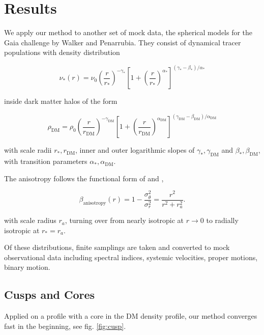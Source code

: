 \section{Results}\label{sec:results}

We apply our method to another set of mock data, the spherical models
for the Gaia challenge by Walker and Penarrubia. They consist of
dynamical tracer populations with density distribution

\begin{equation}
\nu_*(r) = \nu_0\left(\frac{r}{r_*}\right)^{-\gamma_*} \left[1+\left(\frac{r}{r_*}\right)^{\alpha_*}\right]^{(\gamma_*-\beta_*)/\alpha_*}
\end{equation}

inside dark matter halos of the form

\begin{equation}
\rho_{\text{DM}} = \rho_0\left(\frac{r}{r_{\text{DM}}}\right)^{-\gamma_{\text{DM}}}\left[1+\left(\frac{r}{r_{\text{DM}}}\right)^{\alpha_{\text{DM}}}\right]^{(\gamma_{\text{DM}}-\beta_{\text{DM}})/\alpha_{\text{DM}}}
\end{equation}

with scale radii $r_*, r_\text{DM}$, inner and outer logarithmic
slopes of $\gamma_*, \gamma_{\text{DM}}$ and
$\beta_*,\beta_{\text{DM}}$, with transition parameters $\alpha_*,
\alpha_{\text{DM}}$.

The anisotropy follows the functional form of \citet{Osipkov1979} and
\citet{Merritt1985},

\begin{equation}
\beta_{\text{anisotropy}}(r)=1-\frac{\sigma_\theta^2}{\sigma_r^2} = \frac{r^2}{r^2+r_a^2}.
\end{equation}

with scale radius $r_a$, turning over from nearly isotropic at $r\to
0$ to radially isotropic at $r_*=r_a$.

Of these distributions, finite samplings are taken and converted to
mock observational data including spectral indices, systemic
velocities, proper motions, binary motion.


\subsection{Cusps and Cores}

Applied on a profile with a core in the DM density profile, our method
converges fast in the beginning, see fig. \ref{fig:cusp}.

